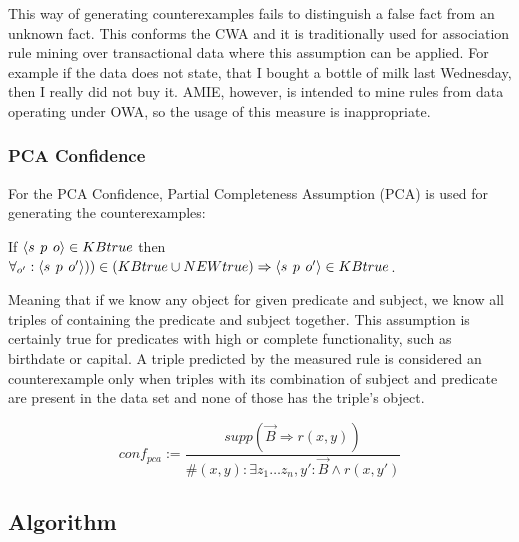 This way of generating counterexamples fails to distinguish a false fact from an unknown fact. This conforms the CWA and it is traditionally used for association rule mining over transactional data where this assumption can be applied. For example if the data does not state, that I bought a bottle of milk last Wednesday, then I really did not buy it. AMIE, however, is intended to mine rules from data operating under OWA, so the usage of this measure is inappropriate.

\subsubsection{PCA Confidence}

For the PCA Confidence, Partial Completeness Assumption (PCA) is used for generating the counterexamples:

If $\langle s\hspace{0.4em}p\hspace{0.4em}o\rangle\in KBtrue$ then $\forall_{o'}: \langle s\hspace{0.4em}p\hspace{0.4em}o'\rangle))\in(KBtrue \cup NEWtrue) \Rightarrow \langle s\hspace{0.4em}p\hspace{0.4em}o'\rangle\in KBtrue$.

Meaning that if we know any object for given predicate and subject, we know all triples of containing the predicate and subject together. This assumption is certainly true for predicates with high or complete functionality, such as birthdate or capital. A triple predicted by the measured rule is considered an counterexample only when triples with its combination of subject and predicate are present in the data set and none of those has the triple's object. 




$$conf_{pca} := \frac{supp(\vec{B} \Rightarrow r(x,y))}{\# (x,y): \exists z_{1}\ldots z_{n},y': \vec{B}\land r(x,y')}$$

\subsection{Algorithm}

